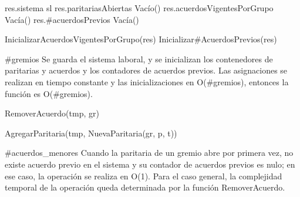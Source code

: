 {
	\state res.sistema \asig sl								
	\state res.paritariasAbiertas \asig Vac\'io()				
	\state res.acuerdosVigentesPorGrupo \asig Vac\'ia()		
	\state res.\#acuerdosPrevios \asig Vac\'ia()					
	\state

	\state InicializarAcuerdosVigentesPorGrupo(res)			
	\state Inicializar\#AcuerdosPrevios(res)						
}
{\#gremios}
{ Se guarda el sistema laboral, y se inicializan los contenedores de paritarias y acuerdos y los contadores de acuerdos previos. Las asignaciones se realizan en tiempo constante y las inicializaciones en O(\#gremios), entonces la funci\'on es O(\#gremios). }

{
					
		\state RemoverAcuerdo(tmp, gr)							
	\endif
	\state

	\state AgregarParitaria(tmp, NuevaParitaria(gr, p, t))		
}
{\#acuerdos\_menores}
{ Cuando la paritaria de un gremio abre por primera vez, no existe acuerdo previo en el sistema y su contador de acuerdos previos es nulo; en ese caso, la operaci\'on se realiza en O(1). Para el caso general, la complejidad temporal de la operaci\'on queda determinada por la funci\'on RemoverAcuerdo. }

